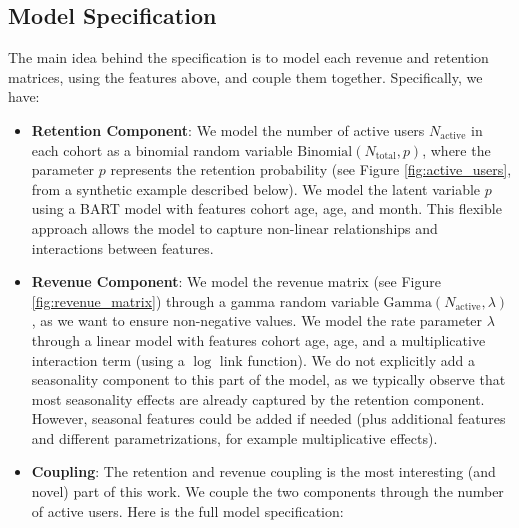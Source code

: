 \documentclass[11pt]{amsart}
\theoremstyle{definition}
\begin{document}
\subsection*{Model Specification}

The main idea behind the specification is to model each revenue and retention matrices, using the features above, and
couple them together. Specifically, we have:

\begin{itemize}
    \item {\bf Retention Component}: We model the number of active users $N_{\text{active}}$ in each cohort as a binomial random
          variable $\text{Binomial}(N_{\text{total}}, p)$, where the parameter $p$ represents the retention probability
          (see Figure \ref{fig:active_users}, from a synthetic example described below). We model the latent variable $p$
          using a BART model with features cohort age, age, and month. This flexible approach allows the model to
          capture non-linear relationships and interactions between features.

    \item {\bf Revenue Component}: We model the revenue matrix (see Figure \ref{fig:revenue_matrix}) through a gamma random variable
          $\text{Gamma}(N_{\text{active}}, \lambda)$, as we want to ensure non-negative values. We model the rate parameter
          $\lambda$ through a linear model with features cohort age, age, and a multiplicative interaction term (using a
          $\log$ link function). We do not explicitly add a seasonality component to this part of the model, as we typically
          observe that most seasonality effects are already captured by the retention component. However, seasonal features
          could be added if needed (plus additional features and different parametrizations, for example multiplicative
          effects).

    \item {\bf Coupling}: The retention and revenue coupling is the most interesting (and novel) part of this work. We
          couple the two components through the number of active users. Here is the full model specification:


\end{itemize}
\end{document}
